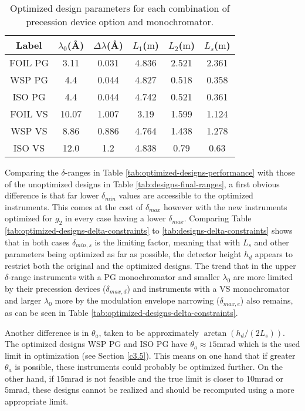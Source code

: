 \begin{table}[h!]
	\centering
	\begin{tabular}{c | c c c c c}
		\toprule
		Label & $\lambda_0$(Å) & $\Delta\lambda$(Å) & $L_1$($\unit{\meter}$) & $L_2$($\unit{\meter}$) & $L_s$($\unit{\meter}$) \\
		\midrule
		FOIL PG & 3.11 & 0.031 & 4.836 & 2.521 & 2.361 \\
		WSP PG & 4.4 & 0.044 & 4.827 & 0.518 & 0.358 \\
		ISO PG & 4.4 & 0.044 & 4.742 & 0.521 & 0.361 \\
		FOIL VS & 10.07 & 1.007 & 3.19 & 1.599 & 1.124 \\
		WSP VS & 8.86 & 0.886 & 4.764 & 1.438 & 1.278 \\
		ISO VS & 12.0 & 1.2 & 4.838 & 0.79 & 0.63 \\
		\bottomrule
	\end{tabular}
	\caption{Optimized design parameters for each combination of precession device option and monochromator. }
	\label{tab:optimized-designs}
\end{table}
Comparing the $\delta$-ranges in Table \ref{tab:optimized-designs-performance} with those of the unoptimized designs in Table \ref{tab:designs-final-ranges}, a first obvious difference is that far lower $\delta_{min}$ values are accessible to the optimized instruments. This comes at the cost of $\delta_{max}$ however with the new instruments optimized for $g_2$ in every case having a lower $\delta_{max}$. Comparing Table \ref{tab:optimized-designs-delta-constraints} to \ref{tab:designs-delta-constraints} shows that in both cases $\delta_{min,s}$ is the limiting factor, meaning that with $L_s$ and other parameters being optimized as far as possible, the detector height $h_d$ appears to restrict both the original and the optimized designs. The trend that in the upper $\delta$-range instruments with a PG monochromator and smaller $\lambda_0$ are more limited by their precession devices ($\delta_{max,d}$) and instruments with a VS monochromator and larger $\lambda_0$ more by the modulation envelope narrowing ($\delta_{max,e}$) also remains, as can be seen in Table \ref{tab:optimized-designs-delta-constraints}.


Another difference is in $\theta_a$, taken to be approximately $\arctan(h_d/(2L_s))$. The optimized designs WSP PG and ISO PG have $\theta_a \approx 15\unit{\milli\radian}$ which is the used limit in optimization (see Section \ref{c3.5}). This means on one hand that if greater $\theta_a$ is possible, these instruments could probably be optimized further. On the other hand, if $15\unit{\milli\radian}$ is not feasible and the true limit is closer to $10\unit{\milli\radian}$ or $5\unit{\milli\radian}$, these designs cannot be realized and should be recomputed using a more appropriate limit. 

